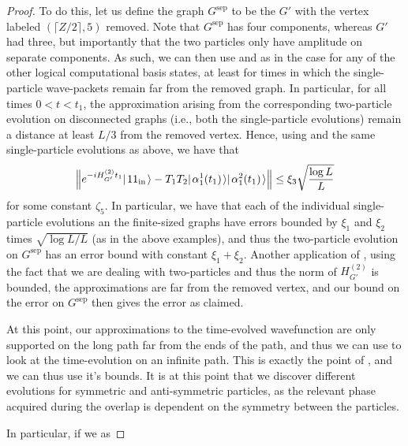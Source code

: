 \documentclass[../thesis-main/thesis-main]{subfiles}
\begin{document}
\begin{proof}

To do this, let us define the graph $G^{\text{sep}}$ to be the $G'$ with the vertex labeled $(\lceil Z/2\rceil, 5)$ removed.  Note that $G^\text{sep}$ has four components, whereas $G'$ had three, but importantly that the two particles only have amplitude on separate components.  As such, we can then use  and  as in the case for any of the other logical computational basis states, at least for times in which the single-particle wave-packets remain far from the removed graph.  In particular, for all times $ 0 < t < t_1$, the approximation arising from the corresponding two-particle evolution on disconnected graphs (i.e., both the single-particle evolutions) remain a distance at least $L/3$ from the removed vertex.  Hence, using  and the same single-particle evolutions as above, we have that
\begin{align}
  \Big\Vert e^{- i H_{G'}^{(2)} t_1} |\mspace{2mu} 11_\text{in} \mspace{2mu} \rangle - T_1 T_2 |\mspace{2mu} \alpha_1^{1}(t_1) \mspace{2mu} \rangle|\mspace{2mu} \alpha_{1}^2 (t_1) \mspace{2mu} \rangle \Big\Vert \leq \xi_3 \sqrt{\frac{\log L}{L}}
\end{align}
for some constant $\zeta_5$.  In particular, we have that each of the individual single-particle evolutions an the finite-sized graphs have errors bounded by $\xi_1$ and $\xi_2$ times $\sqrt{\log L/L}$ (as in the above examples), and thus the two-particle evolution on $G^{\text{sep}}$ has an error bound with constant $\xi_1 + \xi_2$.  Another application of , using the fact that we are dealing with two-particles and thus the norm of $H_{G'}^{(2)}$ is bounded, the approximations are far from the removed vertex, and our bound on the error on $G^{\text{sep}}$ then gives the error as claimed.

At this point, our approximations to the time-evolved wavefunction are only supported on the long path far from the ends of the path, and thus we can use  to look at the time-evolution on an infinite path.  This is exactly the point of , and we can thus use it's bounds.  It is at this point that we discover different evolutions for symmetric and anti-symmetric particles, as the relevant phase acquired during the overlap is dependent on the symmetry between the particles.

In particular, if we as


\end{proof}
\end{document}
